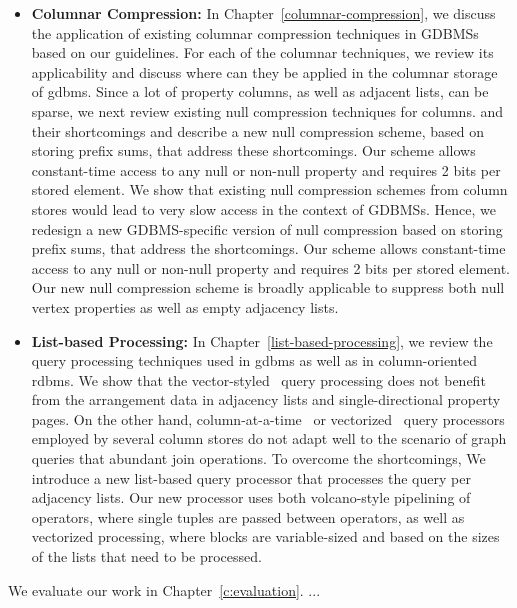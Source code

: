 \begin{itemize}
	\item \textbf{Columnar Compression:} In Chapter~\ref{columnar-compression}, we discuss the application of existing columnar compression techniques in GDBMSs based on our guidelines. For each of the columnar techniques, we review its applicability and discuss where can they be applied in the columnar storage of \gls{gdbms}. Since a lot of property columns, as well as adjacent lists, can be sparse, we next review existing null compression techniques for columns. and their shortcomings and describe a new null compression scheme, based on storing prefix sums, that address these shortcomings. Our scheme allows constant-time access to any null or non-null property and requires 2 bits per stored element. We show that existing null compression schemes from column stores would lead to very slow access in the context of GDBMSs. Hence, we redesign a new GDBMS-specific version of null compression based on storing prefix sums, that address the shortcomings. Our scheme allows constant-time access to any null or non-null property and requires 2 bits per stored element. Our new null compression scheme is broadly applicable to suppress both null vertex properties as well as empty adjacency lists.
	
	\item \textbf{List-based Processing:} In Chapter~\ref{list-based-processing}, we review the query processing techniques used in \gls{gdbms} as well as in column-oriented \gls{rdbms}. We show that the vector-styled~\cite{volcano} query processing does not benefit from the arrangement data in adjacency lists and single-directional property pages. On the other hand, column-at-a-time~\cite{col-vs-row} or vectorized~\cite{boncz-vectorwise1} query processors employed by several column stores do not adapt well to the scenario of graph queries that abundant join operations. To overcome the shortcomings, We introduce a new list-based query processor that processes the query per adjacency lists. Our new processor uses both volcano-style pipelining of operators, where single tuples are passed between operators, as well as vectorized processing, where blocks are variable-sized and based on the sizes of the lists that need to be processed.
\end{itemize}

We evaluate our work in Chapter~\ref{c:evaluation}. ...
